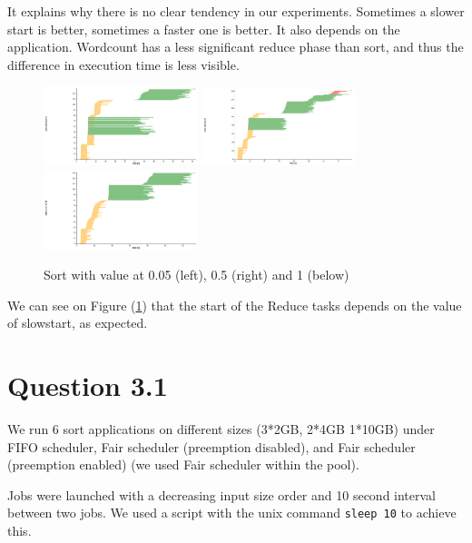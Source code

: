 \documentclass{article}
\begin{document}
It explains why there is no clear tendency in our experiments. Sometimes a slower start is better, sometimes a faster one is better. It also depends on the application. Wordcount has a less significant reduce phase than sort, and thus the difference in execution time is less visible.



\begin{figure}%
  \centering
  \includegraphics[width=0.4\textwidth]{sort005.png}
  \includegraphics[width=0.4\textwidth]{sort05.png}
  \includegraphics[width=0.4\textwidth]{sort1.png}
  \caption{Sort with value at 0.05 (left), 0.5 (right) and 1 (below)}
  \label{values}
\end{figure}

We can see on Figure (\ref{values}) that the start of the Reduce tasks depends on the value of slowstart, as expected.



\section*{Question 3.1}


We run 6 sort applications on different sizes (3*2GB, 2*4GB 1*10GB) under FIFO scheduler, Fair scheduler (preemption disabled), and Fair scheduler
(preemption enabled) (we used Fair scheduler within the pool).

Jobs were launched with a decreasing input size order and 10 second interval between two jobs. We used a script with the unix command \texttt{sleep 10} to achieve this.
\end{document}
